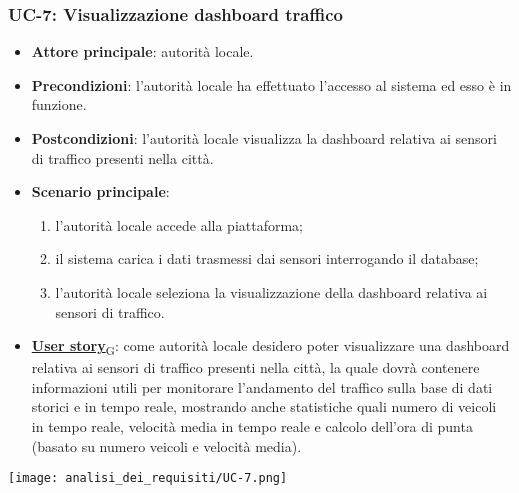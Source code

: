 \subsubsection{UC-7: Visualizzazione dashboard traffico}
\begin{itemize}
	\item \textbf{Attore principale}: autorità locale.
	\item \textbf{Precondizioni}: l'autorità locale ha effettuato l'accesso al sistema ed esso è in funzione.
	\item \textbf{Postcondizioni}: l'autorità locale visualizza la dashboard relativa
	      ai sensori di traffico presenti nella città.
	\item \textbf{Scenario principale}:
	      \begin{enumerate}
		      \item l'autorità locale accede alla piattaforma;
		      \item il sistema carica i dati trasmessi dai sensori interrogando il database;
		      \item l'autorità locale seleziona la visualizzazione della dashboard relativa ai sensori di traffico.
	      \end{enumerate}
	\item \href{https://7last.github.io/docs/rtb/documentazione-interna/glossario\#user-story}{\textbf{User story}\textsubscript{G}}:
	      come autorità locale desidero poter visualizzare una dashboard relativa ai sensori di traffico presenti nella città, la quale
	      dovrà contenere informazioni utili per monitorare l'andamento del traffico sulla base di dati storici e in tempo reale, mostrando
	      anche statistiche quali numero di veicoli in tempo reale, velocità media in tempo reale e calcolo dell'ora di punta (basato su numero veicoli e velocità media).
\end{itemize}
\begin{center}
	\texttt{[image: analisi\_dei\_requisiti/UC-7.png]}
\end{center}


